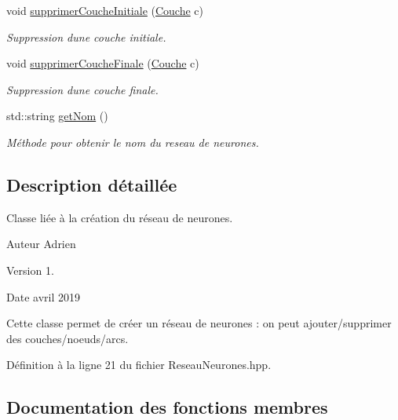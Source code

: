 \begin{DoxyCompactItemize}
void \hyperlink{class_reseau_neurones_a1f8002e2367febe871dda7dc32c02784}{supprimer\+Couche\+Initiale} (\hyperlink{class_couche}{Couche} c)
\begin{DoxyCompactList}\small\item\em Suppression d\textquotesingle{}une couche initiale. \end{DoxyCompactList}\item 
void \hyperlink{class_reseau_neurones_a1451816837d4df8ad486775cc2f9730b}{supprimer\+Couche\+Finale} (\hyperlink{class_couche}{Couche} c)
\begin{DoxyCompactList}\small\item\em Suppression d\textquotesingle{}une couche finale. \end{DoxyCompactList}\item 
std\+::string \hyperlink{class_reseau_neurones_a3dff69c97c748171ca5bacfe521e9063}{get\+Nom} ()
\begin{DoxyCompactList}\small\item\em Méthode pour obtenir le nom du reseau de neurones. \end{DoxyCompactList}\end{DoxyCompactItemize}


\subsection{Description détaillée}
Classe liée à la création du réseau de neurones. 

\begin{DoxyAuthor}{Auteur}
Adrien 
\end{DoxyAuthor}
\begin{DoxyVersion}{Version}
1. 
\end{DoxyVersion}
\begin{DoxyDate}{Date}
avril 2019
\end{DoxyDate}
Cette classe permet de créer un réseau de neurones \+: on peut ajouter/supprimer des couches/noeuds/arcs. 

Définition à la ligne 21 du fichier Reseau\+Neurones.\+hpp.



\subsection{Documentation des fonctions membres}
\mbox{\label{class_reseau_neurones_a8802f175e367ecd5ab3ad2d4d5b91058}} 
